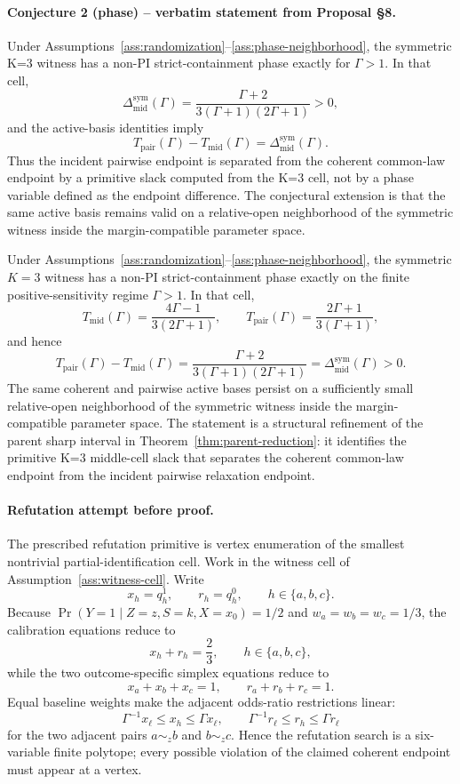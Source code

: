 \paragraph{Conjecture 2 (phase) -- verbatim statement from Proposal \S8.}
Under Assumptions~\ref{ass:randomization}--\ref{ass:phase-neighborhood}, the symmetric K=3 witness has a non-PI strict-containment phase exactly for \(\Gamma>1\).  In that cell,
\[
  \Delta_{\mathrm{mid}}^{\mathrm{sym}}(\Gamma)
  =\frac{\Gamma+2}{3(\Gamma+1)(2\Gamma+1)}>0,
\]
and the active-basis identities imply
\[
  T_{\mathrm{pair}}(\Gamma)-T_{\mathrm{mid}}(\Gamma)
  =
  \Delta_{\mathrm{mid}}^{\mathrm{sym}}(\Gamma).
\]
Thus the incident pairwise endpoint is separated from the coherent common-law endpoint by a primitive slack computed from the K=3 cell, not by a phase variable defined as the endpoint difference.  The conjectural extension is that the same active basis remains valid on a relative-open neighborhood of the symmetric witness inside the margin-compatible parameter space.

\begin{proposition}\label{prop:phase-threshold}
Under Assumptions~\ref{ass:randomization}--\ref{ass:phase-neighborhood}, the symmetric \(K=3\) witness has a non-PI strict-containment phase exactly on the finite positive-sensitivity regime \(\Gamma>1\).  In that cell,
\[
  T_{\mathrm{mid}}(\Gamma)=\frac{4\Gamma-1}{3(2\Gamma+1)},\qquad
  T_{\mathrm{pair}}(\Gamma)=\frac{2\Gamma+1}{3(\Gamma+1)},
\]
and hence
\[
  T_{\mathrm{pair}}(\Gamma)-T_{\mathrm{mid}}(\Gamma)
  =
  \frac{\Gamma+2}{3(\Gamma+1)(2\Gamma+1)}
  =
  \Delta_{\mathrm{mid}}^{\mathrm{sym}}(\Gamma)>0 .
\]
The same coherent and pairwise active bases persist on a sufficiently small relative-open neighborhood of the symmetric witness inside the margin-compatible parameter space.  The statement is a structural refinement of the parent sharp interval in Theorem~\ref{thm:parent-reduction}: it identifies the primitive K=3 middle-cell slack that separates the coherent common-law endpoint from the incident pairwise relaxation endpoint.
\end{proposition}

\paragraph{Refutation attempt before proof.}
The prescribed refutation primitive is vertex enumeration of the smallest nontrivial partial-identification cell.  Work in the witness cell of Assumption~\ref{ass:witness-cell}.  Write
\[
  x_h=q_h^1,\qquad r_h=q_h^0,\qquad h\in\{a,b,c\}.
\]
Because \(\Pr(Y=1\mid Z=z,S=k,X=x_0)=1/2\) and \(w_a=w_b=w_c=1/3\), the calibration equations reduce to
\[
  x_h+r_h=\frac23,\qquad h\in\{a,b,c\},
\]
while the two outcome-specific simplex equations reduce to
\[
  x_a+x_b+x_c=1,\qquad r_a+r_b+r_c=1.
\]
Equal baseline weights make the adjacent odds-ratio restrictions linear:
\[
  \Gamma^{-1}x_\ell\le x_h\le \Gamma x_\ell,\qquad
  \Gamma^{-1}r_\ell\le r_h\le \Gamma r_\ell
\]
for the two adjacent pairs \(a\sim_z b\) and \(b\sim_z c\).  Hence the refutation search is a six-variable finite polytope; every possible violation of the claimed coherent endpoint must appear at a vertex.

